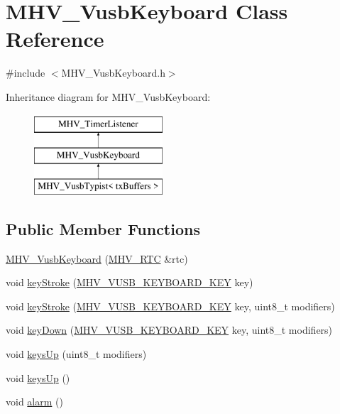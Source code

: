 \hypertarget{class_m_h_v___vusb_keyboard}{\section{M\-H\-V\-\_\-\-Vusb\-Keyboard Class Reference}
\label{class_m_h_v___vusb_keyboard}
}


{\ttfamily \#include $<$M\-H\-V\-\_\-\-Vusb\-Keyboard.\-h$>$}

Inheritance diagram for M\-H\-V\-\_\-\-Vusb\-Keyboard\-:\begin{figure}[H]
\begin{center}
\leavevmode
\includegraphics[height=3.000000cm]{class_m_h_v___vusb_keyboard}
\end{center}
\end{figure}
\subsection*{Public Member Functions}
\begin{DoxyCompactItemize}
\item 
\hyperlink{class_m_h_v___vusb_keyboard_a97774c8ba7d4d9b736de5da63349a0b2}{M\-H\-V\-\_\-\-Vusb\-Keyboard} (\hyperlink{class_m_h_v___r_t_c}{M\-H\-V\-\_\-\-R\-T\-C} \&rtc)
\item 
void \hyperlink{class_m_h_v___vusb_keyboard_a01b3de864f8320c23118ac2ff34ca7a7}{key\-Stroke} (\hyperlink{_m_h_v___vusb_keyboard_8h_a03702cf5dad1661f75eda7bd2e33acb6}{M\-H\-V\-\_\-\-V\-U\-S\-B\-\_\-\-K\-E\-Y\-B\-O\-A\-R\-D\-\_\-\-K\-E\-Y} key)
\item 
void \hyperlink{class_m_h_v___vusb_keyboard_a6d2161121f4eaef0e41e2b6af956155f}{key\-Stroke} (\hyperlink{_m_h_v___vusb_keyboard_8h_a03702cf5dad1661f75eda7bd2e33acb6}{M\-H\-V\-\_\-\-V\-U\-S\-B\-\_\-\-K\-E\-Y\-B\-O\-A\-R\-D\-\_\-\-K\-E\-Y} key, uint8\-\_\-t modifiers)
\item 
void \hyperlink{class_m_h_v___vusb_keyboard_a879506b2ef1622e09070a9ccf11fdd10}{key\-Down} (\hyperlink{_m_h_v___vusb_keyboard_8h_a03702cf5dad1661f75eda7bd2e33acb6}{M\-H\-V\-\_\-\-V\-U\-S\-B\-\_\-\-K\-E\-Y\-B\-O\-A\-R\-D\-\_\-\-K\-E\-Y} key, uint8\-\_\-t modifiers)
\item 
void \hyperlink{class_m_h_v___vusb_keyboard_a0dd607bb70fe5f5354f407e8c4f12df1}{keys\-Up} (uint8\-\_\-t modifiers)
\item 
void \hyperlink{class_m_h_v___vusb_keyboard_a02ac5757295595e455ef3103d2ccc1de}{keys\-Up} ()
\item 
void \hyperlink{class_m_h_v___vusb_keyboard_a9d59ac54f1b17ece17c038dc3f5bd026}{alarm} ()
\end{DoxyCompactItemize}
